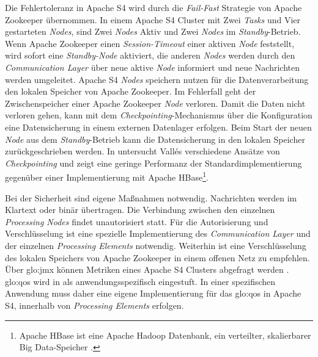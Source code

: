 Die Fehlertoleranz in Apache S4 wird durch die \textit{Fail-Fast} Strategie von Apache Zookeeper übernommen. In einem Apache S4 Cluster mit Zwei \textit{Tasks} und Vier gestarteten \textit{Nodes}, sind Zwei \textit{Nodes} Aktiv und Zwei \textit{Nodes} im \textit{Standby}-Betrieb. Wenn Apache Zookeeper einen \textit{Session-Timeout} einer aktiven \textit{Node} feststellt, wird sofort eine \textit{Standby-Node} aktiviert, die anderen \textit{Nodes} werden durch den \textit{Communication Layer} über neue aktive \textit{Node} informiert und neue Nachrichten werden umgeleitet. Apache S4 \textit{Nodes} speichern nutzen für die Datenverarbeitung den lokalen Speicher von Apache Zookeeper. Im Fehlerfall geht der Zwischenspeicher einer Apache Zookeeper \textit{Node} verloren. Damit die Daten nicht verloren gehen, kann mit dem \textit{Checkpointing}-Mechanismus über die Konfiguration eine Datensicherung in einem externen Datenlager erfolgen. Beim Start der neuen \textit{Node} aus dem \textit{Standby}-Betrieb kann die Datensicherung in den lokalen Speicher zurückgeschrieben werden. In  untersucht Vall{\'e}s verschiedene Ansätze von \textit{Checkpointing} und zeigt eine geringe Performanz der Standardimplementierung gegenüber einer Implementierung mit Apache HBase\footnote{Apache HBase ist eine Apache Hadoop Datenbank, ein verteilter, skalierbarer Big Data-Speicher .}. 

Bei der Sicherheit sind eigene Maßnahmen notwendig. Nachrichten werden im Klartext oder binär übertragen. Die Verbindung zwischen den einzelnen \textit{Processing Nodes} findet unautorisiert statt. Für die Autorisierung und Verschlüsselung ist eine spezielle Implementierung des \textit{Communication Layer} und der einzelnen \textit{Processing Elements} notwendig. Weiterhin ist eine Verschlüsselung des lokalen Speichers von Apache Zookeeper in einem offenen Netz zu empfehlen. Über \gls{glo:jmx} können Metriken eines Apache S4 Clusters abgefragt werden . \gls{glo:qos} wird in  als anwendungsspezifisch eingestuft. In einer spezifischen Anwendung muss daher eine eigene Implementierung für das \gls{glo:qos} in Apache S4, innerhalb von \textit{Processing Elements} erfolgen.


